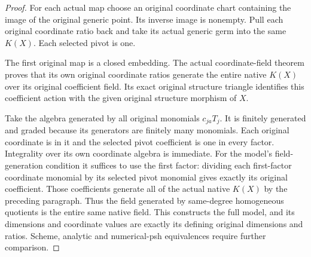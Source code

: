 \begin{proof}
For each actual map choose an original coordinate chart
containing the image of the original generic point. Its
inverse image is nonempty. Pull each original coordinate
ratio back and take its actual generic germ into the same
$K(X)$. Each selected pivot is one.

The first original map is a closed embedding. The actual
coordinate-field theorem proves that its own original
coordinate ratios generate the entire native $K(X)$ over
its original coefficient field. Its exact original structure
triangle identifies this coefficient action with the given
original structure morphism of $X$.

Take the algebra generated by all original monomials
$c_{ja}T_j$. It is finitely generated and graded because
its generators are finitely many monomials. Each original
coordinate is in it and the selected pivot coefficient is
one in every factor. Integrality over its own coordinate
algebra is immediate. For the model's field-generation
condition it suffices to use the first factor: dividing
each first-factor coordinate monomial by its selected
pivot monomial gives exactly its original coefficient.
Those coefficients generate all of the actual native
$K(X)$ by the preceding paragraph. Thus the field generated
by same-degree homogeneous quotients is the entire same
native field. This constructs the full model, and its
dimensions and coordinate values are exactly its defining
original dimensions and ratios. Scheme, analytic and
numerical-psh equivalences require further comparison.
\end{proof}
